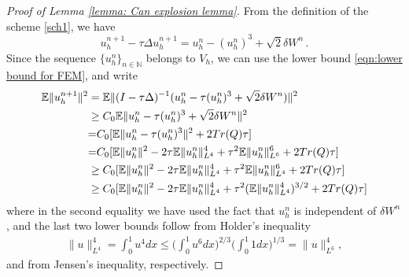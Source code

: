 \documentclass[reqno, 11pt]{amsart}
\theoremstyle{plain}
\theoremstyle{definition}
\theoremstyle{remark}
\numberwithin{equation}{section}
\numberwithin{theorem}{section}
\begin{document}
{ 
 \begin{proof}[Proof of Lemma \ref{lemma: Can explosion lemma}]
 From the definition of the scheme \eqref{sch1}, we have
 $$
u_h^{n+1} - \tau\Delta u_h^{n+1} = u_h^n-(u_h^n)^3+\sqrt{2}\delta W^n \,.
$$
Since the sequence $\{u_h^n\}_{n \in \mathbb N}$ belongs to $V_h$,   we can use the lower bound \eqref{eqn:lower bound for FEM}, and write
 \begin{align}
\mathbb{E}\|u^{n+1}_h\|^2&=\mathbb{E}\|(I-\tau\Delta)^{-1}(u^n_h-\tau (u_h^n)^3+\sqrt{2}\delta W^n)\|^2\notag\\
 &\geq C_0\mathbb{E} \|u^n_h-\tau (u_h^n)^3+\sqrt{2}\delta W^n\|^2\notag\\
 &{=} C_0 [\mathbb{E}\|u^n_h-\tau (u_h^n)^3\|^2+2Tr(Q)\tau]\notag\\
 &{=}  C_0[\mathbb{E}\|u^n_h\|^2-2\tau\mathbb{E}\|u^n_h\|_{L^4}^4+\tau^2\mathbb{E}\|u^n_h\|_{L^6}^6+2Tr(Q)\tau]\notag\\
 &\geq C_0[\mathbb{E}\|u^n_h\|^2-2\tau\mathbb{E}\|u^n_h\|_{L^4}^4+\tau^2\mathbb{E}\|u^n_h\|_{L^4}^6+2Tr(Q)\tau]\notag\\
 &\geq C_0[\mathbb{E}\|u^n_h\|^2-2\tau\mathbb{E}\|u^n_h\|_{L^4}^4+\tau^2(\mathbb{E}\|u^n_h\|_{L^4}^4)^{3/2}+2Tr(Q)\tau]  \label{func tilde f}
 \end{align}
 where in the second equality we have used the fact that $u_h^n$ is independent of $\delta W^n$, and the last two lower bounds follow from Holder's inequality
 \begin{align}
 \|u\|_{L^4}^4=\int_0^1 u^4dx\leq \bigg(\int_0^1 u^6dx\bigg)^{2/3} \bigg(\int_0^1 1dx\bigg)^{1/3}=\|u\|_{L^6}^4, 
 \end{align}
 and from Jensen's inequality, respectively. 


\end{proof}}
\end{document}
